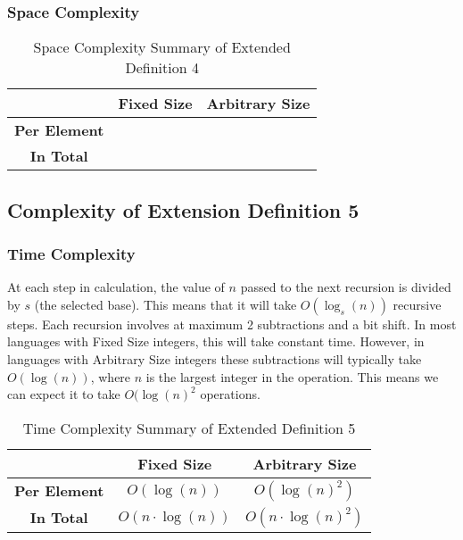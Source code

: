 \documentclass[conference]{IEEEtran}
\begin{document}
\subsubsection{Space Complexity}

\begin{table}[H]
    \centering
    \caption{Space Complexity Summary of Extended Definition 4}
    \begin{tabular}{|c|c|c|}
        \hline
        & \textbf{Fixed Size} & \textbf{Arbitrary Size} \\
        \hline
        \textbf{Per Element} &  &  \\
        \hline
        \textbf{In Total} &  &  \\
        \hline
    \end{tabular}
    \label{tab:space_pn_d04}
\end{table}

\subsection{Complexity of Extension Definition 5}
\label{ca:pn_d05}

\subsubsection{Time Complexity}

At each step in calculation, the value of $n$ passed to the next recursion is divided by $s$ (the selected base). This means that it will take $O(\log_s(n))$ recursive steps. Each recursion involves at maximum 2 subtractions and a bit shift. In most languages with Fixed Size integers, this will take constant time. However, in languages with Arbitrary Size integers these subtractions will typically take $O(\log(n))$, where $n$ is the largest integer in the operation. This means we can expect it to take $O(\log(n)^2$ operations.

\renewcommand{\arraystretch}{1.25}
\begin{table}[H]
    \centering
    \caption{Time Complexity Summary of Extended Definition 5}
    \begin{tabular}{|c|c|c|}
        \hline
        & \textbf{Fixed Size} & \textbf{Arbitrary Size} \\
        \hline
        \textbf{Per Element} & $O(\log(n))$ & $O(\log(n)^2)$ \\
        \hline
        \textbf{In Total} & $O(n \cdot \log(n))$ & $O(n \cdot \log(n)^2)$ \\
        \hline
    \end{tabular}
    \label{tab:time_pn_d05}
\end{table}
\renewcommand{\arraystretch}{1}
\end{document}
